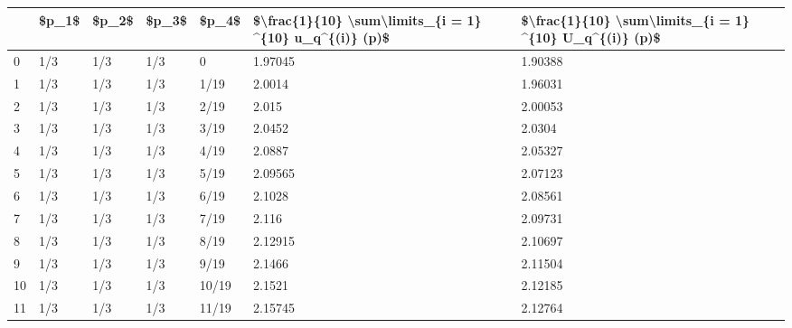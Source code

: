 \begin{tabular}{lllllll}
\toprule
{} & \$p\_1\$ & \$p\_2\$ & \$p\_3\$ &  \$p\_4\$ & \$\textbackslash frac\{1\}\{10\} \textbackslash sum\textbackslash limits\_\{i = 1\} \textasciicircum  \{10\} u\_q\textasciicircum \{(i)\} (p)\$ & \$\textbackslash frac\{1\}\{10\} \textbackslash sum\textbackslash limits\_\{i = 1\} \textasciicircum  \{10\} U\_q\textasciicircum \{(i)\} (p)\$ \\
\midrule
0  &   1/3 &   1/3 &   1/3 &      0 &                                            1.97045 &                                            1.90388 \\
1  &   1/3 &   1/3 &   1/3 &   1/19 &                                             2.0014 &                                            1.96031 \\
2  &   1/3 &   1/3 &   1/3 &   2/19 &                                              2.015 &                                            2.00053 \\
3  &   1/3 &   1/3 &   1/3 &   3/19 &                                             2.0452 &                                             2.0304 \\
4  &   1/3 &   1/3 &   1/3 &   4/19 &                                             2.0887 &                                            2.05327 \\
5  &   1/3 &   1/3 &   1/3 &   5/19 &                                            2.09565 &                                            2.07123 \\
6  &   1/3 &   1/3 &   1/3 &   6/19 &                                             2.1028 &                                            2.08561 \\
7  &   1/3 &   1/3 &   1/3 &   7/19 &                                              2.116 &                                            2.09731 \\
8  &   1/3 &   1/3 &   1/3 &   8/19 &                                            2.12915 &                                            2.10697 \\
9  &   1/3 &   1/3 &   1/3 &   9/19 &                                             2.1466 &                                            2.11504 \\
10 &   1/3 &   1/3 &   1/3 &  10/19 &                                             2.1521 &                                            2.12185 \\
11 &   1/3 &   1/3 &   1/3 &  11/19 &                                            2.15745 &                                            2.12764 \\

\end{tabular}
